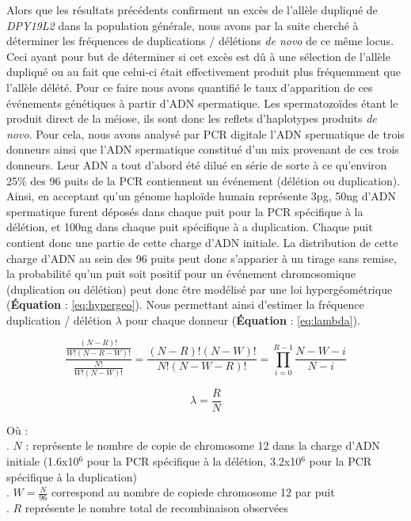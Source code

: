 \documentclass[12pt,twoside]{ugathesis}
\begin{document}
Alors que les résultats précédents confirment un excès de l'allèle
dupliqué de \emph{DPY19L2} dans la population générale, nous avons par
la suite cherché à déterminer les fréquences de duplications / délétions
\emph{de novo} de ce même locus. Ceci ayant pour but de déterminer si
cet excès est dû à une sélection de l'allèle dupliqué ou au fait que
celui-ci était effectivement produit plus fréquemment que l'allèle
délété. Pour ce faire nous avons quantifié le taux d'apparition de ces
événements génétiques à partir d'ADN spermatique. Les spermatozoïdes
étant le produit direct de la méiose, ils sont donc les reflets
d'haplotypes produits \emph{de novo}. Pour cela, nous avons analysé par
PCR digitale l'ADN spermatique de trois donneurs ainsi que l'ADN
spermatique constitué d'un mix provenant de ces trois donneurs. Leur ADN
a tout d'abord été dilué en série de sorte à ce qu'environ 25\% des 96
puits de la PCR contiennent un événement (délétion ou duplication).
Ainsi, en acceptant qu'un génome haploïde humain représente 3pg, 50ng
d'ADN spermatique furent déposés dans chaque puit pour la PCR spécifique
à la délétion, et 100ng dans chaque puit spécifique à a duplication.
Chaque puit contient donc une partie de cette charge d'ADN initiale. La
distribution de cette charge d'ADN au sein des 96 puits peut donc
s'apparier à un tirage sans remise, la probabilité qu'un puit soit
positif pour un événement chromosomique (duplication ou délétion) peut
donc être modélisé par une loi hypergéométrique (\textbf{Équation} :
\eqref{eq:hypergeo}). Nous permettant ainsi d'estimer la fréquence
duplication / délétion \(\lambda\) pour chaque donneur
(\textbf{Équation} : \eqref{eq:lambda}).

\begin{equation} 
\frac{\frac{(N - R)!}{W!(N-R-W)!}}{\frac{N!}{W!(N-W)!}} = \frac{(N-R)!(N-W)!}{N!(N-W-R)!} = \prod_{i=0}^{R-1}{\frac{N-W-i}{N-i}}
\label{eq:hypergeo}
\end{equation}

\begin{equation} 
\lambda = \frac{R}{N}
\label{eq:lambda}
\end{equation}

Où :\\
. \(N\) : représente le nombre de copie de chromosome 12 dans la charge
d'ADN initiale (1.6x10\({^6}\) pour la PCR spécifique à la délétion,
3.2x10\({^6}\) pour la PCR spécifique à la duplication)\\
. \(W = \frac{N}{96}\) correspond au nombre de copiede chromosome 12 par
puit\\
. \(R\) représente le nombre total de recombinaison observées
\end{document}

